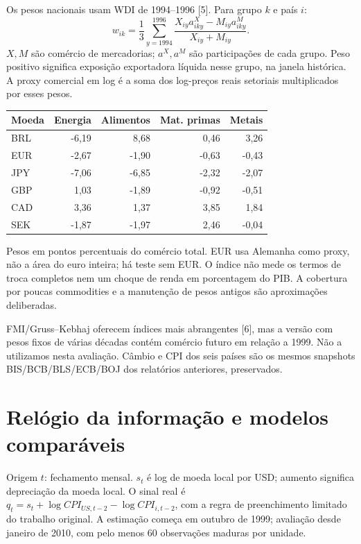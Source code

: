 \documentclass[11pt,a4paper]{article}
\begin{document}
Os pesos nacionais usam WDI de 1994--1996 [5]. Para grupo $k$ e país $i$:
\[ w_{ik}=\frac{1}{3}\sum_{y=1994}^{1996}\frac{X_{iy}a^X_{iky}-M_{iy}a^M_{iky}}{X_{iy}+M_{iy}}. \]
$X,M$ são comércio de mercadorias; $a^X,a^M$ são participações de cada grupo. Peso positivo significa exposição exportadora líquida nesse grupo, na janela histórica. A proxy comercial em log é a soma dos log-preços reais setoriais multiplicados por esses pesos.
\small\begin{center}\begin{tabular}{lrrrr}\toprule
Moeda & Energia & Alimentos & Mat. primas & Metais \\ \midrule
BRL & -6,19 & 8,68 & 0,46 & 3,26 \\
EUR & -2,67 & -1,90 & -0,63 & -0,43 \\
JPY & -7,06 & -6,85 & -2,32 & -2,07 \\
GBP & 1,03 & -1,89 & -0,92 & -0,51 \\
CAD & 3,36 & 1,37 & 3,85 & 1,84 \\
SEK & -1,87 & -1,97 & 2,46 & -0,04 \\
\bottomrule\end{tabular}\end{center}\normalsize

Pesos em pontos percentuais do comércio total. EUR usa Alemanha como proxy, não a área do euro inteira; há teste sem EUR. O índice não mede os termos de troca completos nem um choque de renda em porcentagem do PIB. A cobertura por poucas commodities e a manutenção de pesos antigos são aproximações deliberadas.

FMI/Gruss--Kebhaj oferecem índices mais abrangentes [6], mas a versão com pesos fixos de várias décadas contém comércio futuro em relação a 1999. Não a utilizamos nesta avaliação. Câmbio e CPI dos seis países são os mesmos snapshots BIS/BCB/BLS/ECB/BOJ dos relatórios anteriores, preservados.

\clearpage

\section*{Relógio da informação e modelos comparáveis}
Origem $t$: fechamento mensal. $s_t$ é log de moeda local por USD; aumento significa depreciação da moeda local. O sinal real é $q_t=s_t+\log CPI_{US,t-2}-\log CPI_{i,t-2}$, com a regra de preenchimento limitado do trabalho original. A estimação começa em outubro de 1999; avaliação desde janeiro de 2010, com pelo menos 60 observações maduras por unidade.
\end{document}

